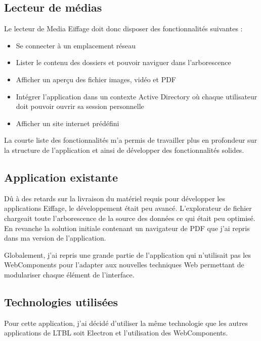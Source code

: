 \clearpage

\subsection{Lecteur de médias}

Le lecteur de Media Eiffage doit donc disposer des fonctionnalités suivantes :

\begin{itemize}
    \item Se connecter à un emplacement réseau
    \item Lister le contenu des dossiers et pouvoir naviguer dans l'arborescence
    \item Afficher un aperçu des fichier images, vidéo et PDF
    \item Intégrer l'application dans un contexte Active Directory où chaque utilisateur doit pouvoir ouvrir sa session personnelle
    \item Afficher un site internet prédéfini
\end{itemize}

La courte liste des fonctionnalités m'a permis de travailler plus en profondeur sur la structure de l'application et ainsi de développer des fonctionnalités solides.

\subsection{Application existante}

Dû à des retards sur la livraison du matériel requis pour développer les applications Eiffage, le développement était peu avancé.
L'explorateur de fichier chargeait toute l'arborescence de la source des données ce qui était peu optimisé.
En revanche la solution initiale contenant un navigateur de PDF que j'ai repris dans ma version de l'application.

Globalement, j'ai repris une grande partie de l'application qui n'utilisait pas les WebComponents pour l'adapter aux nouvelles techniques Web permettant de modulariser chaque élément de l'interface.

\subsection{Technologies utilisées}

Pour cette application, j'ai décidé d'utiliser la même technologie que les autres applications de LTBL soit Electron et l'utilisation des WebComponents.

